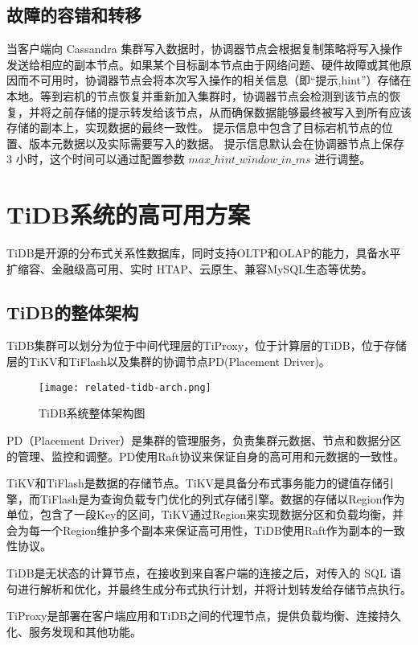 \subsection{故障的容错和转移}

当客户端向 Cassandra 集群写入数据时，协调器节点会根据复制策略将写入操作发送给相应的副本节点。如果某个目标副本节点由于网络问题、硬件故障或其他原因而不可用时，协调器节点会将本次写入操作的相关信息（即“提示,hint”）存储在本地。等到宕机的节点恢复并重新加入集群时，协调器节点会检测到该节点的恢复，并将之前存储的提示转发给该节点，从而确保数据能够最终被写入到所有应该存储的副本上，实现数据的最终一致性。
提示信息中包含了目标宕机节点的位置、版本元数据以及实际需要写入的数据。
提示信息默认会在协调器节点上保存 3 小时，这个时间可以通过配置参数 $max\_hint\_window\_in\_ms$ 进行调整。


\section{TiDB系统的高可用方案}
TiDB\cite{huang2020tidb}是开源的分布式关系性数据库，同时支持OLTP和OLAP的能力，具备水平扩缩容、金融级高可用、实时 HTAP、云原生、兼容MySQL生态等优势。

\subsection{TiDB的整体架构}

TiDB集群可以划分为位于中间代理层的TiProxy，位于计算层的TiDB，位于存储层的TiKV和TiFlash以及集群的协调节点PD(Placement Driver)。

\begin{figure}
  \centering
  \texttt{[image: related-tidb-arch.png]}
  \caption{TiDB系统整体架构图}
  \label{fig:tidb-arch}
\end{figure}

PD（Placement Driver）是集群的管理服务，负责集群元数据、节点和数据分区的管理、监控和调整。PD使用Raft协议来保证自身的高可用和元数据的一致性。

TiKV和TiFlash是数据的存储节点。TiKV是具备分布式事务能力的键值存储引擎，而TiFlash是为查询负载专门优化的列式存储引擎。数据的存储以Region作为单位，包含了一段Key的区间，TiKV通过Region来实现数据分区和负载均衡，并会为每一个Region维护多个副本来保证高可用性，TiDB使用Raft作为副本的一致性协议。

TiDB是无状态的计算节点，在接收到来自客户端的连接之后，对传入的 SQL 语句进行解析和优化，并最终生成分布式执行计划，并将计划转发给存储节点执行。

TiProxy是部署在客户端应用和TiDB之间的代理节点，提供负载均衡、连接持久化、服务发现和其他功能。


